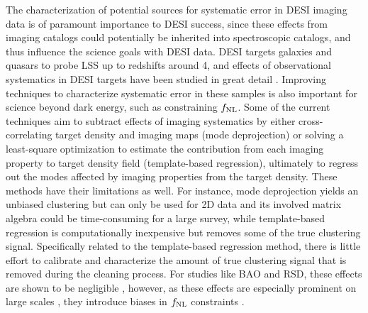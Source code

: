 The characterization of potential sources for systematic error in DESI imaging data is of paramount importance to DESI success, since these effects from imaging catalogs could potentially be inherited into spectroscopic catalogs, and thus influence the science goals with DESI data. DESI targets galaxies and quasars to probe LSS up to redshifts around 4, and effects of observational systematics in DESI targets have been studied in great detail \cite[see, e.g.,][]{zhou2021clustering, chaussidon2022angular}. Improving techniques to characterize systematic error in these samples is also important for science beyond dark energy, such as constraining $f_{\rm NL}$. Some of the current techniques aim to subtract effects of imaging systematics by either cross-correlating target density and imaging maps (mode deprojection) or solving a least-square optimization to estimate the contribution from each imaging property to target density field (template-based regression), ultimately to regress out the modes affected by imaging properties from the target density. These methods have their limitations as well. For instance, mode deprojection yields an unbiased clustering but can only be used for 2D data and its involved matrix algebra could be time-consuming for a large survey, while template-based regression is computationally inexpensive but removes some of the true clustering signal. Specifically related to the template-based regression method, there is little effort to calibrate and characterize the amount of true clustering signal that is removed during the cleaning process. For studies like BAO and RSD, these effects are shown to be negligible \citep{merz2021clustering}, however, as these effects are especially prominent on large scales \citep{rezaie2021primordial}, they introduce biases in $f_{\rm NL}$ constraints \citep{mueller2022primordial}.  
 

